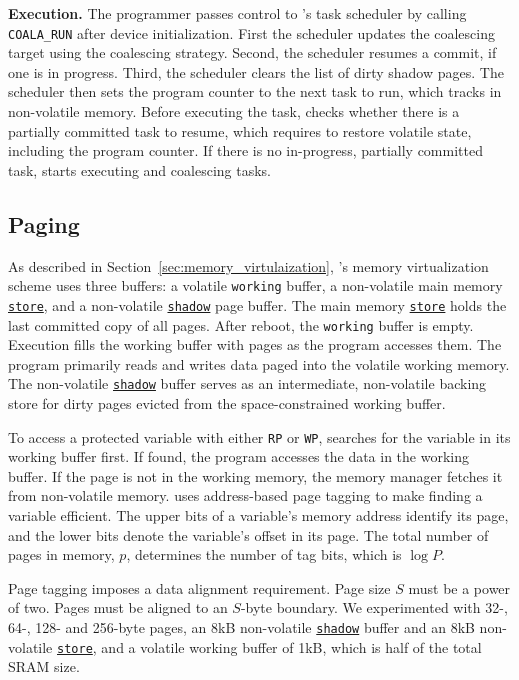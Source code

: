 \textbf{Execution.} The programmer passes control to \sys's task scheduler 
by calling \texttt{COALA\_RUN} after device initialization. 
%
First the scheduler updates the coalescing target using the coalescing
strategy.  Second, the scheduler resumes a commit, if one is in progress. Third,
the scheduler clears the list of dirty shadow pages. The scheduler then 
sets the program counter to the next task to run, which \sys tracks in  
non-volatile memory.  
%
Before executing the task, \sys checks whether there is a partially committed
task to resume, which requires \sys to restore volatile state, including the program
counter.  
%
If there is no in-progress, partially committed task, \sys starts executing and
coalescing tasks. 

\subsection{Paging}
\label{sec:impl:paging}

As described in Section~\ref{sec:memory_virtulaization}, \sys's memory
virtualization scheme uses three buffers: a volatile \texttt{working} buffer, a
non-volatile main memory \texttt{\underline{store}}, and a non-volatile
\texttt{\underline{shadow}} page buffer. 
%
The main memory \texttt{\underline{store}} holds the last committed copy of all 
pages. 
%
After reboot, the \texttt{working} buffer is empty. Execution fills 
the working buffer with pages as the program accesses them. 
%
The program primarily reads and writes data paged into the volatile working memory. 
%
The non-volatile \texttt{\underline{shadow}} buffer serves as an intermediate,
non-volatile backing store for dirty pages evicted from the space-constrained
working buffer. 

To access a protected variable with either \texttt{RP}
or \texttt{WP}, \sys searches for the variable in its working buffer first. If
found, the program accesses the data in the working buffer.  If the page is not 
in the working memory, the memory manager fetches it from non-volatile memory. 
%
\sys uses address-based page tagging to make finding a variable efficient.  The
upper bits of a variable's memory address identify its page, and the lower bits
denote the variable's offset in its page. The total number of pages in memory,
$p$, determines the number of tag bits, which is $\log P$.

Page tagging imposes a data alignment requirement.
Page size $S$ must be a power of two. 
%
Pages must be aligned to an $S$-byte boundary. 
%
We experimented with 32-, 64-, 128- and 256-byte pages, an 8kB non-volatile \texttt{\underline{shadow}} buffer and
an 8kB non-volatile \texttt{\underline{store}}, and a volatile working buffer
of 1kB, which is half of the total SRAM size. 

